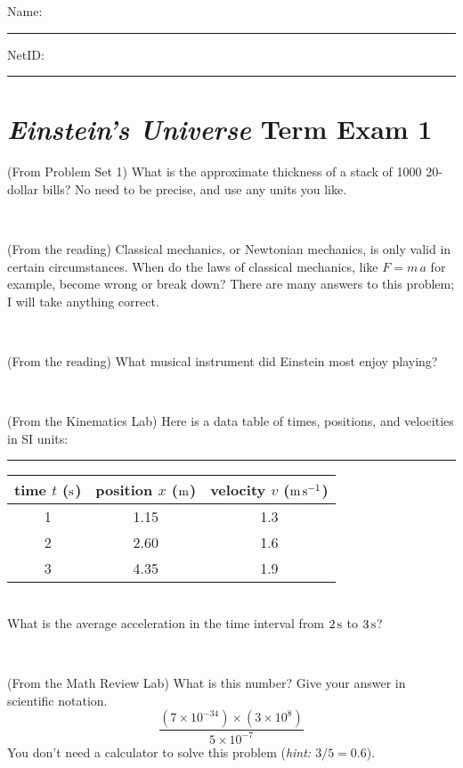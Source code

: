 \documentclass[12pt, letterpaper]{article}
\begin{document}
\noindent
Name: \rule[-1ex]{0.60\textwidth}{0.1pt}
NetID: \rule[-1ex]{0.20\textwidth}{0.1pt}

\section*{\textsl{Einstein's Universe} Term Exam 1}
\setcounter{problem}{1}


\begin{problem} (From Problem Set 1)
What is the approximate thickness of a stack of 1000 20-dollar bills?
No need to be precise, and use any units you like.
\end{problem}


\vfill ~

\begin{problem} (From the reading)
Classical mechanics, or Newtonian mechanics, is only valid in certain
circumstances. When do the laws of classical mechanics, like $F =
m\,a$ for example, become wrong or break down? There are many answers
to this problem; I will take anything correct.
\end{problem}


\vfill ~

\begin{problem} (From the reading)
What musical instrument did Einstein most enjoy playing?
\end{problem}


\vfill ~

\begin{problem} (From the Kinematics Lab)
Here is a data table of times, positions, and velocities in SI units:\\
\rule{1.0in}{0pt}\begin{tabular}{c|c|c}
time $t$ ($\mathrm{s}$) & position $x$ ($\mathrm{m}$) & velocity $v$ ($\mathrm{m}\,\mathrm{s}^{-1}$) \\
\hline
1 & 1.15 & 1.3 \\
2 & 2.60 & 1.6 \\
3 & 4.35 & 1.9 \\
\hline
\end{tabular}\\
What is the average acceleration in the time interval from $2\,\mathrm{s}$ to $3\,\mathrm{s}$?
\end{problem}


\vfill ~


\clearpage


\begin{problem} (From the Math Review Lab)
What is this number? Give your answer in scientific notation.
$$
\frac{(7\times10^{-34})\times(3\times10^8)}{5\times10^{-7}}
$$
You don't need a calculator to solve this problem (\textit{hint: $3/5=0.6$}).
\end{problem}
\end{document}

